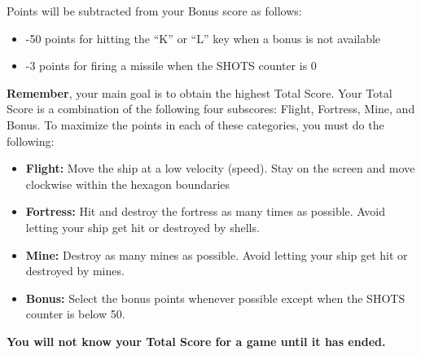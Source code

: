 \documentclass[letterpaper,12pt]{article}
\begin{document}
\noindent
Points will be subtracted from your Bonus score as follows:
\begin{itemize}
\item -50 points for hitting the ``K'' or ``L'' key when a bonus is not available
\item -3 points for firing a missile when the SHOTS counter is 0
\end{itemize}

\noindent
\textbf{Remember}, your main goal is to obtain the highest Total Score. Your Total Score is a
combination of the following four subscores: Flight, Fortress, Mine, and Bonus. To maximize the
points in each of these categories, you must do the following:

\begin{itemize}
\item \textbf{Flight:} Move the ship at a low velocity (speed). Stay on the screen and move
clockwise within the hexagon boundaries
\item \textbf{Fortress:} Hit and destroy the fortress as many times as possible. Avoid letting your
ship get hit or destroyed by shells.
\item \textbf{Mine:} Destroy as many mines as possible. Avoid letting your ship get hit or destroyed
by mines.
\item \textbf{Bonus:} Select the bonus points whenever possible except when the SHOTS counter is
below 50.
\end{itemize}

\begin{center}
\textbf{You will not know your Total Score for a game until it has ended.}
\end{center}
\end{document}
